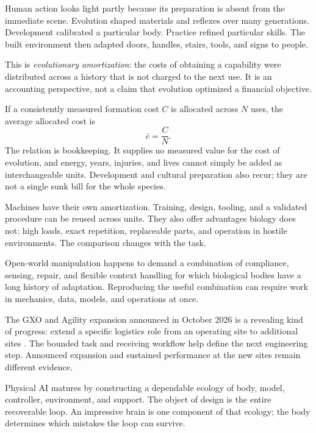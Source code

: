 Human action looks light partly because its preparation is absent from the immediate scene. Evolution shaped materials and reflexes over many generations. Development calibrated a particular body. Practice refined particular skills. The built environment then adapted doors, handles, stairs, tools, and signs to people.

This is \emph{evolutionary amortization}: the costs of obtaining a capability were distributed across a history that is not charged to the next use. It is an accounting perspective, not a claim that evolution optimized a financial objective.

If a consistently measured formation cost $C$ is allocated across $N$ uses, the average allocated cost is
\begin{equation}
 \bar c=\frac{C}{N}.
\end{equation}
The relation is bookkeeping. It supplies no measured value for the cost of evolution, and energy, years, injuries, and lives cannot simply be added as interchangeable units. Development and cultural preparation also recur; they are not a single sunk bill for the whole species.

Machines have their own amortization. Training, design, tooling, and a validated procedure can be reused across units. They also offer advantages biology does not: high loads, exact repetition, replaceable parts, and operation in hostile environments. The comparison changes with the task.

Open-world manipulation happens to demand a combination of compliance, sensing, repair, and flexible context handling for which biological bodies have a long history of adaptation. Reproducing the useful combination can require work in mechanics, data, models, and operations at once.

The GXO and Agility expansion announced in October 2026 is a revealing kind of progress: extend a specific logistics role from an operating site to additional sites \cite{gxo2026digit}. The bounded task and receiving workflow help define the next engineering step. Announced expansion and sustained performance at the new sites remain different evidence.

Physical AI matures by constructing a dependable ecology of body, model, controller, environment, and support. The object of design is the entire recoverable loop. An impressive brain is one component of that ecology; the body determines which mistakes the loop can survive.
